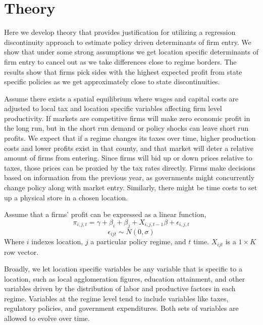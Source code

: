 \section{Theory}

Here we develop theory that provides justification for utilizing a regression discontinuity approach to estimate policy driven determinants of firm entry. We show that under some strong assumptions we get location specific determinants of firm entry to cancel out as we take differences close to regime borders. The results show that firms pick sides with the highest expected profit from state specific policies as we get approximately close to state discontinuities.

Assume there exists a spatial equilibrium where wages and capital costs are adjusted to local tax and location specific variables affecting firm level productivity. If markets are competitive firms will make zero economic profit in the long run, but in the short run demand or policy shocks can leave short run profits. We expect that if a regime changes its taxes over time, higher production costs and lower profits exist in that county, and that market will deter a relative amount of firms from entering. Since firms will bid up or down prices relative to taxes, those prices can be proxied by the tax rates directly. Firms make decisions based on information from the previous year, as governments might concurrently change policy along with market entry. Similarly, there might be time costs to set up a physical store in a chosen location.

\begin{assumption}
Assume that a firms' profit can be expressed as a linear function,
\begin{equation}
\pi_{i,j,t} =  \gamma+\beta_{i}+\beta_{j}+X_{i,j,t-1}\beta+\epsilon_{i,j,t}
\end{equation}
\begin{equation}
\epsilon_{ijt} \sim N(0,\sigma)
\end{equation}
Where $i$ indexes location, $j$ a particular policy regime, and $t$ time. $X_{ijt}$ is a $1 \times K$ row vector.
\end{assumption}

Broadly, we let location specific variables be any variable that is specific to a location, such as local agglomeration figures, education attainment, and other variables driven by the distribution of labor and productive factors in each regime. Variables at the regime level tend to include variables like taxes, regulatory policies, and government expenditures. Both sets of variables are allowed to evolve over time.

